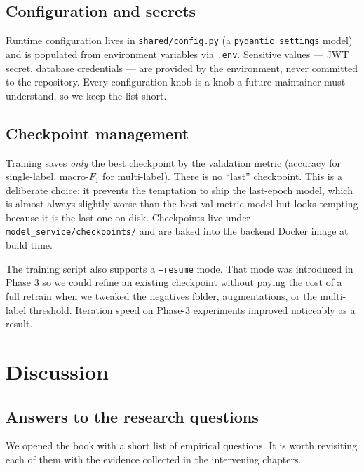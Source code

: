 \documentclass[11pt,a4paper,oneside]{report}
\begin{document}
\section{Configuration and secrets}

Runtime configuration lives in \texttt{shared/config.py} (a
\texttt{pydantic\_settings} model) and is populated from
environment variables via \texttt{.env}. Sensitive values ---
JWT secret, database credentials --- are provided by the
environment, never committed to the repository. Every configuration
knob is a knob a future maintainer must understand, so we keep the
list short.

\section{Checkpoint management}

Training saves \emph{only} the best checkpoint by the validation
metric (accuracy for single-label, macro-\(F_1\) for multi-label).
There is no ``last'' checkpoint. This is a deliberate choice: it
prevents the temptation to ship the last-epoch model, which is
almost always slightly worse than the best-val-metric model but
looks tempting because it is the last one on disk. Checkpoints
live under \texttt{model\_service/checkpoints/} and are baked into
the backend Docker image at build time.

The training script also supports a \texttt{--resume} mode. That
mode was introduced in Phase 3 so we could refine an existing
checkpoint without paying the cost of a full retrain when we
tweaked the negatives folder, augmentations, or the multi-label
threshold. Iteration speed on Phase-3 experiments improved
noticeably as a result.

\chapter{Discussion}\label{ch:discussion}

\section{Answers to the research questions}

We opened the book with a short list of empirical questions. It
is worth revisiting each of them with the evidence collected in
the intervening chapters.
\end{document}
